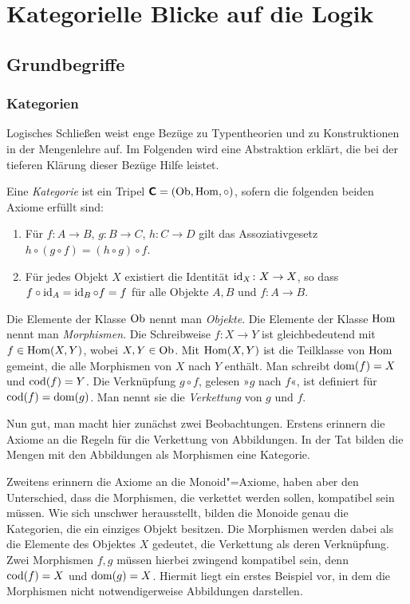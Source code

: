
\chapter{Kategorielle Blicke auf die Logik}

\section{Grundbegriffe}

\subsection{Kategorien}

Logisches Schließen weist enge Bezüge zu Typentheorien und zu
Konstruktionen in der Mengenlehre auf. Im Folgenden wird eine
Abstraktion erklärt, die bei der tieferen Klärung dieser
Bezüge Hilfe leistet.

\begin{Definition}[Kategorie]
Eine \emph{Kategorie} ist ein Tripel $\textsf{\textbf{C}} = (\operatorname{Ob},\operatorname{Hom},{\circ})$,
sofern die folgenden beiden Axiome erfüllt sind:
\begin{enumerate}
\item Für $f\colon A\to B$, $g\colon B\to C$, $h\colon C\to D$ gilt
das Assoziativgesetz\\
$h\circ (g\circ f) = (h\circ g)\circ f$.
\item Für jedes Objekt $X$ existiert die Identität $\operatorname{id}_X\colon X\to X$,
so dass $f\circ\operatorname{id}_A = \operatorname{id}_B\circ f=f$ für alle Objekte $A,B$
und $f\colon A\to B$.
\end{enumerate}
\end{Definition}
Die Elemente der Klasse $\operatorname{Ob}$ nennt man \emph{Objekte}. Die Elemente der
Klasse $\operatorname{Hom}$ nennt man \emph{Morphismen}.  Die Schreibweise
$f\colon X\to Y$ ist gleichbedeutend mit $f\in\operatorname{Hom}(X,Y)$, wobei $X,Y\in\operatorname{Ob}$.
Mit $\operatorname{Hom}(X,Y)$ ist die Teilklasse von $\operatorname{Hom}$ gemeint, die alle
Morphismen von $X$ nach $Y$ enthält. Man schreibt $\operatorname{dom}(f) = X$ und
$\operatorname{cod}(f) = Y$. Die Verknüpfung $g\circ f$, gelesen »$g$ nach $f$«, ist
definiert für $\operatorname{cod}(f)=\operatorname{dom}(g)$. Man nennt sie die \emph{Verkettung}
von $g$ und $f$.

Nun gut, man macht hier zunächst zwei Beobachtungen. Erstens erinnern
die Axiome an die Regeln für die Verkettung von Abbildungen.
In der Tat bilden die Mengen mit den Abbildungen als Morphismen
eine Kategorie.

Zweitens erinnern die Axiome an die Monoid"=Axiome, haben aber den
Unterschied, dass die Morphismen, die verkettet werden sollen, kompatibel
sein müssen. Wie sich unschwer herausstellt, bilden die Monoide genau
die Kategorien, die ein einziges Objekt besitzen. Die Morphismen werden
dabei als die Elemente des Objektes $X$ gedeutet, die Verkettung als deren
Verknüpfung. Zwei Morphismen $f,g$ müssen hierbei zwingend kompatibel sein,
denn $\operatorname{cod}(f)=X$ und $\operatorname{dom}(g)=X$. Hiermit liegt ein erstes Beispiel vor,
in dem die Morphismen nicht notwendigerweise Abbildungen darstellen.

